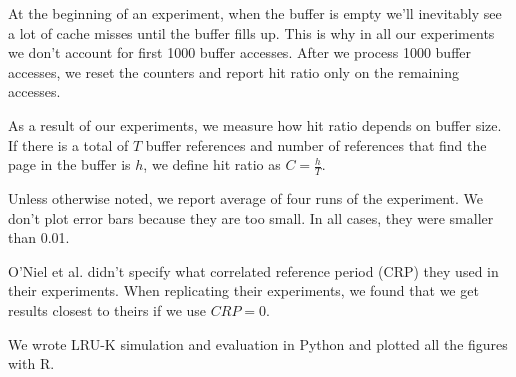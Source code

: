 At the beginning of an experiment, when the buffer is empty we'll inevitably see a lot of cache misses until the buffer fills up. This is why in all our experiments we don't account for first 1000 buffer accesses. After we process 1000 buffer accesses, we reset the counters and report hit ratio only on the remaining accesses.

As a result of our experiments, we measure how hit ratio depends on buffer size. If there is a total of $T$ buffer references and number of references that find the page in the buffer is $h$, we define hit ratio as $C = \frac{h}{T}$.

Unless otherwise noted, we report average of four runs of the experiment. We don't plot error bars because they are too small. In all cases, they were smaller than 0.01.

O'Niel et al. \cite{lruk} didn't specify what correlated reference period (CRP) they used in their experiments. When replicating their experiments, we found that we get results closest to theirs if we use $CRP = 0$.

We wrote LRU-K simulation and evaluation in Python and plotted all the figures with R.